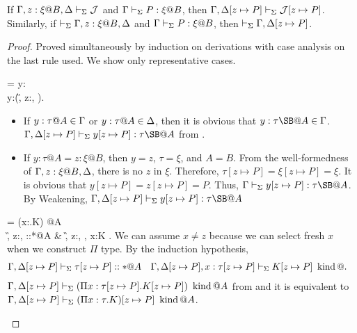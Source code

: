 \begin{lemma}
    \label{lemma:TermSubstitution}
    If $\G, z:\xi@B, \D \V \mathcal{J}$ and $\Gamma\vdash_\Sigma P:\xi @B$, then $\Gamma, \Delta[z \mapsto P] \vdash_\Sigma \mathcal{J}[z \mapsto P]$.  Similarly, if $\V \G, z:\xi@B, \D$ and
    $\Gamma\vdash_\Sigma P:\xi @B$, then $\vdash_\Sigma \Gamma, \Delta[z \mapsto P]$.
\end{lemma}

\begin{proof}
    Proved simultaneously by induction on derivations with case analysis on the last rule used.
    We show only representative cases.
    {
        \newcommand{\SB}{[z \mapsto P]}
        \newcommand{\GG}{\G}
        \newcommand{\GGV}{\G \V}

        \begin{rneqncase}{\TVar{}}{
                 = y:\tau@A\\
                y:\tau@A \in (\G, z:\xi@B, \D).
                }
                \begin{itemize}
                    \item If $y:\tau@A \in \G$ or $y:\tau@A \in \D$, then it is obvious that $y:\tau\SB@A \in \GG$.
                        \(\G,\D\SB \V y\SB:\tau\SB@A\) from \TVar.

                    \item If $y:\tau@A = z:\xi@B$, then
                        $y = z$, $\tau = \xi$, and $A = B$.
                        From the well-formedness of \( \G, z:\xi@B,\D \), there is no $z$ in $\xi$.
                        Therefore, $\tau\SB = \xi\SB = \xi$.
                        It is obvious that $y\SB = z\SB = P$.
                        Thus, $\G \V y\SB : \tau\SB@A$.
                        By Weakening, $\G,\D\SB \V y\SB : \tau\SB@A$

                \end{itemize}
        \end{rneqncase}

        \begin{rneqncase}{\WAbs{}}{
                 =  (\Pi x:\tau.K) \iskind @A\\
                \G, z:\xi@B, \D \V \tau::*@A & \G, z:\xi@B, \D, x:\tau \V K \iskind@A.
                }
                We can assume $x \neq z$ because we can select fresh $x$ when we construct $\Pi$ type.
                By the induction hypothesis,
                \begin{align*}
                    & \G,\D\SB \V \tau\SB::*@A &  & \G,\D\SB, x:\tau\SB \V K\SB \iskind@.
                \end{align*}
                $\G,\D\SB \V (\Pi x:\tau\SB.K\SB) \iskind @A$ from \WAbs{} and
                it is equivalent to $\G,\D\SB \V (\Pi x:\tau.K)\SB \iskind @A$.
        \end{rneqncase}

}
\end{proof}
